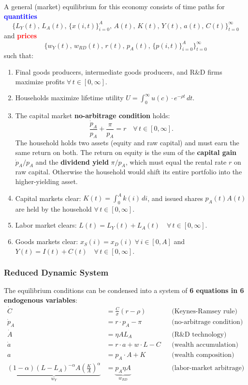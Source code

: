 A general (market) equilibrium for this economy consists of time paths for \textcolor{blue}{\textbf{quantities}}
\[
    \{L_Y(t),\, L_A(t),\, \{x(i,t)\}_{i=0}^{A},\, A(t),\, K(t),\, Y(t),\, a(t),\, C(t)\}_{t=0}^{\infty}
\]
and \textcolor{red}{\textbf{prices}}
\[
    \{w_Y(t),\, w_{RD}(t),\, r(t),\, p_A(t),\, \{p(i,t)\}_{i=0}^{A}\}_{t=0}^{\infty}
\]
such that:
\begin{enumerate}
    \item Final goods producers, intermediate goods producers, and R\&D firms maximize profits $\forall\, t \in [0,\infty]$.
    \item Households maximize lifetime utility $U = \int_0^\infty u(c) \cdot e^{-\rho t}\, dt$.
    \item The capital market \textbf{no-arbitrage condition} holds:
    \[
        \frac{\dot{p}_A}{p_A} + \frac{\pi}{p_A} = r \quad \forall\, t \in [0,\infty].
    \]
    The household holds two assets (equity and raw capital) and must earn the same return on both. The return on equity is the sum of the \textbf{capital gain} $\dot{p}_A/p_A$ and the \textbf{dividend yield} $\pi/p_A$, which must equal the rental rate $r$ on raw capital. Otherwise the household would shift its entire portfolio into the higher-yielding asset.
    \item Capital markets clear: $K(t) = \int_0^A k(i)\, di$, and issued shares $p_A(t) A(t)$ are held by the household $\forall\, t \in [0,\infty]$.
    \item Labor market clears: $L(t) = L_Y(t) + L_A(t) \quad \forall\, t \in [0,\infty]$.
    \item Goods markets clear: $x_S(i) = x_D(i) \;\forall\, i \in [0,A]$ and $Y(t) = I(t) + C(t) \quad \forall\, t \in [0,\infty]$.
\end{enumerate}

\subsubsection*{Reduced Dynamic System}

The equilibrium conditions can be condensed into a system of \textbf{6 equations in 6 endogenous variables}:
\begin{align*}
    \dot{C}     &= \frac{C}{\sigma}(r-\rho)         &&\text{(Keynes-Ramsey rule)} \\
    \dot{p}_A   &= r \cdot p_A - \pi                &&\text{(no-arbitrage condition)} \\
    \dot{A}     &= \eta A L_A                       &&\text{(R\&D technology)} \\
    \dot{a}     &= r \cdot a + w \cdot L - C        &&\text{(wealth accumulation)} \\
    a           &= p_A \cdot A + K                  &&\text{(wealth composition)} \\
    \underbrace{(1-\alpha)(L-L_A)^{-\alpha} A \left(\tfrac{K}{A}\right)^\alpha}_{w_Y} 
                &= \underbrace{p_A \eta A}_{w_{RD}} &&\text{(labor-market arbitrage)}
\end{align*}

